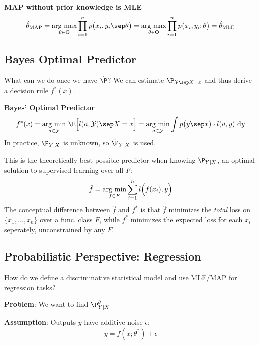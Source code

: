 \lemma \textbf{MAP without prior knowledge is MLE}\\
{\footnotesize
$$
    \hat{\theta}_\text{MAP} = \underset{\theta\in\Theta}{\text{arg max}} \prod_{i=1}^n p\bigl( x_i,y_i \sep \theta \bigr) = \underset{\theta\in\Theta}{\text{arg max}} \prod_{i=1}^n p\bigl( x_i,y_i; \theta \bigr) = \hat{\theta}_\text{MLE}
$$
}

\newpage
\subsection{Bayes Optimal Predictor}
What can we do once we have $\hat{\P}$? We can estimate $\P_{\mathcal{Y}\sep X=x}$ and thus derive a decision rule $f^*(x)$.

 \textbf{Bayes' Optimal Predictor}\\
{\small
$$
    f^*(x) = \underset{a \in \mathcal{Y}}{\text{arg min}}\ \E\Bigl[ l(a,\mathcal{Y}) \sep X=x \Bigr] = \underset{a\in\mathcal{Y}}{\text{arg min}}\int p\bigl( y\sep x \bigr)\cdot l(a,y)\ \text{d}y 
$$
}
{\footnotesize
    \remark In practice, $\P_{Y|X}$ is unknown, so $\hat{\P}_{Y|X}$ is used.
}

This is the theoretically best possible predictor when knowing $\P_{Y|X}$, an optimal solution to supervised learning over all $F$:
$$
    \hat{f} = \underset{f\in F}{\text{arg min}}\sum_{i=1}^n l\Bigl( f(x_i),y \Bigr)
$$
The conceptual difference between $\hat{f}$ and $f^*$ is that $\hat{f}$ minimizes the \textit{total} loss on $\{x_1,\ldots,x_n\}$ over a func. class $F$, while $f^*$ minimizes the expected loss for each $x_i$ seperately, unconstrained by any $F$.

\subsection{Probabilistic Perspective: Regression}

How do we define a discriminative statistical model and use MLE/MAP for regression tasks?

\textbf{Problem}: We want to find $\P_{Y|X}^\theta$

\textbf{Assumption}: Outputs $y$ have additive noise $\epsilon$:\\
$$
    y = f(x;\theta^*) + \epsilon
$$

